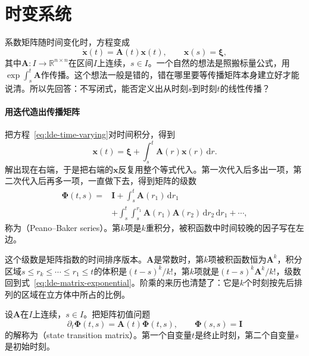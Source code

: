 \section{时变系统}
\label{sec:lde-time-varying}

系数矩阵随时间变化时，方程变成
\begin{equation}
 \dot{\bm{x}}(t)=\bm{A}(t)\bm{x}(t),\qquad \bm{x}(s)=\bm{\xi},
 \label{eq:lde-time-varying}
\end{equation}
其中$\bm{A}:I\to\mathbb{R}^{n\times n}$在区间$I$上连续，$s\in I$。一个自然的想法是照搬标量公式，用$\exp\int_s^t\bm{A}$作传播。这个想法一般是错的，错在哪里要等传播矩阵本身建立好才能说清。所以先回答：不写闭式，能否定义出从时刻$s$到时刻$t$的线性传播？

\paragraph{用迭代造出传播矩阵}
把方程~\eqref{eq:lde-time-varying}对时间积分，得到
\[
 \bm{x}(t)=\bm{\xi}+\int_s^t\bm{A}(r)\bm{x}(r)\,\mathrm{d}r.
\]
解出现在右端，于是把右端的$\bm{x}$反复用整个等式代入。第一次代入后多出一项，第二次代入后再多一项，一直做下去，得到矩阵的级数
\begin{equation}
 \begin{aligned}
 \bm{\Phi}(t,s)={}&\bm{I}+\int_s^t\bm{A}(r_1)\,\mathrm{d}r_1\\
 &+\int_s^t\!\!\int_s^{r_1}\bm{A}(r_1)\bm{A}(r_2)\,\mathrm{d}r_2\,\mathrm{d}r_1+\cdots,
 \end{aligned}
 \label{eq:lde-peano-baker}
\end{equation}
称为（Peano--Baker series）。第$k$项是$k$重积分，被积函数中时间较晚的因子写在左边。

这个级数是矩阵指数的时间排序版本。$\bm{A}$是常数时，第$k$项被积函数恒为$\bm{A}^k$，积分区域$s\leq r_k\leq\cdots\leq r_1\leq t$的体积是$(t-s)^k/k!$，第$k$项就是$(t-s)^k\bm{A}^k/k!$，级数回到式~\eqref{eq:lde-matrix-exponential}。阶乘的来历也清楚了：它是$k$个时刻按先后排列的区域在立方体中所占的比例。

\begin{definition}[状态转移矩阵]
\label{def:lde-transition}
设$\bm{A}$在$I$上连续，$s\in I$。把矩阵初值问题
\begin{equation}
 \partial_t\bm{\Phi}(t,s)=\bm{A}(t)\bm{\Phi}(t,s),\qquad \bm{\Phi}(s,s)=\bm{I}
 \label{eq:lde-transition}
\end{equation}
的解称为（state transition matrix）。第一个自变量$t$是终止时刻，第二个自变量$s$是初始时刻。
\end{definition}

